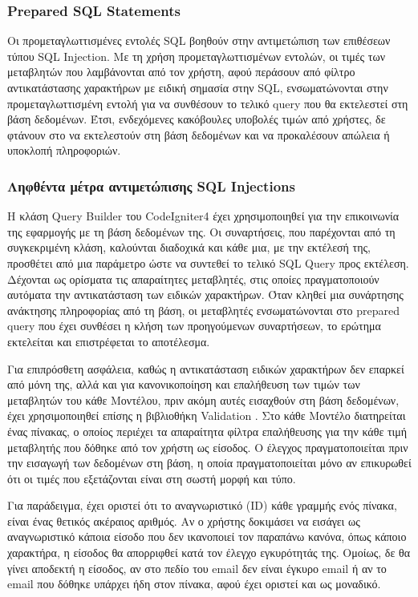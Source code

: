 \subsubsection{Prepared SQL Statements}
Οι προμεταγλωττισμένες εντολές SQL βοηθούν στην αντιμετώπιση των επιθέσεων τύπου SQL Injection. Με τη χρήση προμεταγλωττισμένων εντολών, οι τιμές των μεταβλητών που λαμβάνονται από τον χρήστη, αφού περάσουν από φίλτρο αντικατάστασης χαρακτήρων με ειδική σημασία στην SQL, ενσωματώνονται στην προμεταγλωττισμένη εντολή για να συνθέσουν το τελικό query που θα εκτελεστεί στη βάση δεδομένων. Έτσι, ενδεχόμενες κακόβουλες υποβολές τιμών από χρήστες, δε φτάνουν στο να εκτελεστούν στη βάση δεδομένων και να προκαλέσουν απώλεια ή υποκλοπή πληροφοριών.

\subsubsection{Ληφθέντα μέτρα αντιμετώπισης SQL Injections}
Η κλάση Query Builder του CodeIgniter4 \cite{CodeIgniter_querybuilder} έχει χρησιμοποιηθεί για την επικοινωνία της εφαρμογής με τη βάση δεδομένων της. Οι συναρτήσεις, που παρέχονται από τη συγκεκριμένη κλάση, καλούνται διαδοχικά και κάθε μια, με την εκτέλεσή της, προσθέτει από μια παράμετρο ώστε να συντεθεί το τελικό SQL Query προς εκτέλεση. Δέχονται ως ορίσματα τις απαραίτητες μεταβλητές, στις οποίες πραγματοποιούν αυτόματα την αντικατάσταση των ειδικών χαρακτήρων. Όταν κληθεί μια συνάρτησης ανάκτησης πληροφορίας από τη βάση, οι μεταβλητές ενσωματώνονται στο prepared query που έχει συνθέσει η κλήση των προηγούμενων συναρτήσεων, το ερώτημα εκτελείται και επιστρέφεται το αποτέλεσμα.

Για επιπρόσθετη ασφάλεια, καθώς η αντικατάσταση ειδικών χαρακτήρων δεν επαρκεί από μόνη της, αλλά και για κανονικοποίηση και επαλήθευση των τιμών των μεταβλητών του κάθε Μοντέλου, πριν ακόμη αυτές εισαχθούν στη βάση δεδομένων, έχει χρησιμοποιηθεί επίσης η βιβλιοθήκη Validation \cite{CodeIgniter_validation}. Στο κάθε Μοντέλο διατηρείται ένας πίνακας, ο οποίος περιέχει τα απαραίτητα φίλτρα επαλήθευσης για την κάθε τιμή μεταβλητής που δόθηκε από τον χρήστη ως είσοδος. Ο έλεγχος πραγματοποιείται πριν την εισαγωγή των δεδομένων στη βάση, η οποία πραγματοποιείται μόνο αν επικυρωθεί ότι οι τιμές που εξετάζονται είναι στη σωστή μορφή και τύπο.

Για παράδειγμα, έχει οριστεί ότι το αναγνωριστικό (ID) κάθε γραμμής ενός πίνακα, είναι ένας θετικός ακέραιος αριθμός. Αν ο χρήστης δοκιμάσει να εισάγει ως αναγνωριστικό κάποια είσοδο που δεν ικανοποιεί τον παραπάνω κανόνα, όπως κάποιο χαρακτήρα, η είσοδος θα απορριφθεί κατά τον έλεγχο εγκυρότητάς της. Ομοίως, δε θα γίνει αποδεκτή η είσοδος, αν στο πεδίο του email δεν είναι έγκυρο email ή αν το email που δόθηκε υπάρχει ήδη στον πίνακα, αφού έχει οριστεί και ως μοναδικό.

